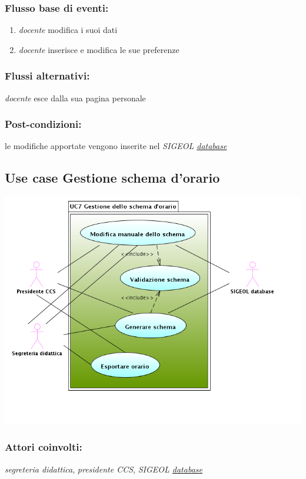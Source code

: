 \documentclass[11pt,a4paper]{article}
\begin{document}
\subsubsection*{Flusso base di eventi:}
\begin{enumerate}
 \item \textit{docente} modifica i suoi dati 
 \item \textit{docente} inserisce e modifica le sue preferenze
\end{enumerate}
\subsubsection*{Flussi alternativi:}
\textit{docente} esce dalla sua pagina personale
\subsubsection*{Post-condizioni:}
le modifiche apportate vengono inserite nel \textit{SIGEOL \underline{database}}
\subsection{Use case Gestione schema d'orario}
\begin{center} 
 \includegraphics[scale=0.5]{images/UseCaseGestioneSchemaOrario.png}
\end{center}
\subsubsection*{Attori coinvolti:}
\textit{segreteria didattica}, \textit{presidente CCS}, \textit{SIGEOL \underline{database}}
\end{document}
